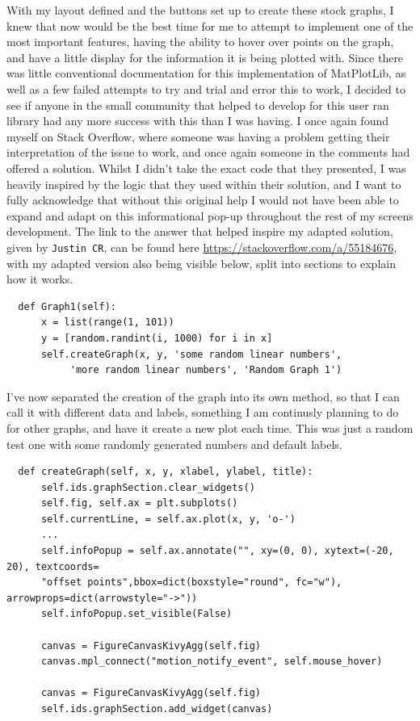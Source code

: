 \documentclass{article}
\begin{document}
With my layout defined and the buttons set up to create these stock graphs, I knew that now would be the best time for me to attempt to implement one of the most important features, having the ability to hover over points on the graph, and have a little display for the information it is being plotted with. Since there was little conventional documentation for this implementation of MatPlotLib, as well as a few failed attempts to try and trial and error this to work, I decided to see if anyone in the small community that helped to develop for this user ran library had any more success with this than I was having. I once again found myself on Stack Overflow, where someone was having a problem getting their interpretation of the issue to work, and once again someone in the comments had offered a solution. Whilst I didn't take the exact code that they presented, I was heavily inspired by the logic that they used within their solution, and I want to fully acknowledge that without this original help I would not have been able to expand and adapt on this informational pop-up throughout the rest of my screens development. The link to the answer that helped inspire my adapted solution, given by \texttt{Justin CR}, can be found here \url{https://stackoverflow.com/a/55184676}, with my adapted version also being visible below, split into sections to explain how it works.\\\vspace{0.3cm}

\begin{verbatim}
  def Graph1(self):
      x = list(range(1, 101))
      y = [random.randint(i, 1000) for i in x]
      self.createGraph(x, y, 'some random linear numbers', 
           'more random linear numbers', 'Random Graph 1')
\end{verbatim}

\vspace{0.3cm}
I've now separated the creation of the graph into its own method, so that I can call it with different data and labels, something I am continusly planning to do for other graphs, and have it create a new plot each time. This was just a random test one with some randomly generated numbers and default labels.\\\vspace{0.3cm}

\begin{verbatim}
  def createGraph(self, x, y, xlabel, ylabel, title):
      self.ids.graphSection.clear_widgets()
      self.fig, self.ax = plt.subplots()
      self.currentLine, = self.ax.plot(x, y, 'o-')
      ...
      self.infoPopup = self.ax.annotate("", xy=(0, 0), xytext=(-20, 20), textcoords=
      "offset points",bbox=dict(boxstyle="round", fc="w"), arrowprops=dict(arrowstyle="->"))
      self.infoPopup.set_visible(False)

      canvas = FigureCanvasKivyAgg(self.fig)
      canvas.mpl_connect("motion_notify_event", self.mouse_hover)
      
      canvas = FigureCanvasKivyAgg(self.fig)
      self.ids.graphSection.add_widget(canvas)
\end{verbatim}
\end{document}
